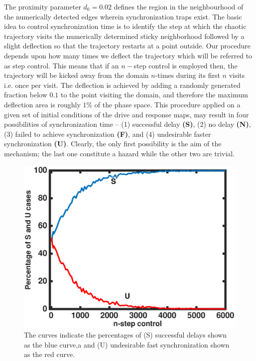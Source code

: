 \documentclass[reprint,superscriptaddress,amsmath,amssymb,aps,pre]{revtex4-1}
\begin{document}
The proximity parameter $d_0 = 0.02$ defines the region in the neighbourhood of the numerically detected edges wherein synchronization traps exist. The basic idea to control synchronization time is to identify the step at which the chaotic trajectory visits the numerically determined sticky neighborhood followed by a slight deflection so that the trajectory restarts at a point outside.  Our procedure depends upon how many times we deflect the trajectory  which will be referred to as step control. This means that if an $n-$step control is  employed then, the trajectory will be kicked away from the domain $n$-times during its first $n$ visits i.e. once per visit. The deflection is achieved by adding a randomly generated fraction below $0.1$ to the point visiting the domain, and therefore the maximum deflection area is roughly $1\%$ of the phase space.  This procedure applied on a given set of initial conditions of the drive and response maps, may result in four possibilities of synchronization time -- (1) successful delay  \textbf{(S)}, (2) no delay \textbf{(N)}, (3) failed to achieve synchronization \textbf{(F)}, and (4) undesirable faster synchronization \textbf{(U)}. Clearly, the only first possibility is the aim of the mechanism; the last one constitute a hazard while the other two are trivial. 
\begin{figure}[h]
	\includegraphics[scale=0.45]{S_U_Percent}
	\caption{\label{fig:Control_success}\footnotesize The curves indicate the 
		percentages of (S) successful delays shown as the blue curve,a and (U) 
		undesirable fast synchronization shown as the red curve. }
\end{figure}
\end{document}
